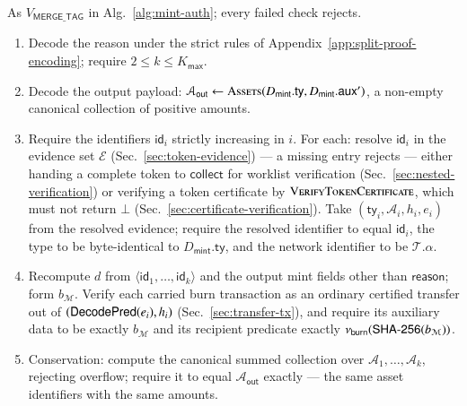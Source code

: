 As $V_{\mathsf{MERGE\_TAG}}$ in Alg.~\ref{alg:mint-auth}; every failed check rejects.
\begin{enumerate}
	\item Decode the reason under the strict rules of Appendix~\ref{app:split-proof-encoding}; require $2 \le k \le K_\mathsf{max}$.
	\item Decode the output payload: $\mathcal{A}_\mathsf{out} \gets \Call{Assets}{D_\mathsf{mint}.\mathsf{ty}, D_\mathsf{mint}.\auxd'}$, a non-empty canonical collection of positive amounts.
	\item Require the identifiers $\mathsf{id}_i$ strictly increasing in $i$. For each: resolve $\mathsf{id}_i$ in the evidence set $\mathcal{E}$ (Sec.~\ref{sec:token-evidence}) --- a missing entry rejects --- either handing a complete token to $\mathsf{collect}$ for worklist verification (Sec.~\ref{sec:nested-verification}) or verifying a token certificate by $\Call{VerifyTokenCertificate}{}$, which must not return $\bot$ (Sec.~\ref{sec:certificate-verification}). Take $(\mathsf{ty}_i, \mathcal{A}_i, h_i, e_i)$ from the resolved evidence; require the resolved identifier to equal $\mathsf{id}_i$, the type to be byte-identical to $D_\mathsf{mint}.\mathsf{ty}$, and the network identifier to be $\mathcal{T}.\alpha$.
	\item Recompute $d$ from $\langle\mathsf{id}_1,\ldots,\mathsf{id}_k\rangle$ and the output mint fields other than $\mathsf{reason}$; form $b_\mathcal{M}$. Verify each carried burn transaction as an ordinary certified transfer out of $(\mathsf{DecodePred}(e_i), h_i)$ (Sec.~\ref{sec:transfer-tx}), and require its auxiliary data to be exactly $b_\mathcal{M}$ and its recipient predicate exactly $\nu_\mathsf{burn}(\mathsf{SHA\text{-}256}(b_\mathcal{M}))$.
	\item Conservation: compute the canonical summed collection over $\mathcal{A}_1, \ldots, \mathcal{A}_k$, rejecting overflow; require it to equal $\mathcal{A}_\mathsf{out}$ exactly --- the same asset identifiers with the same amounts.
\end{enumerate}

